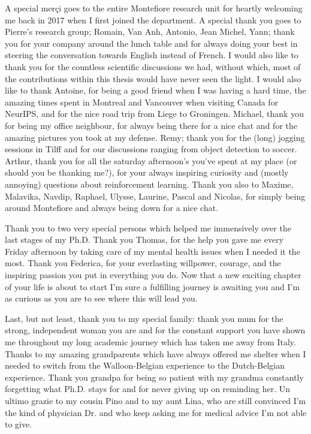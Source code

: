 A special merçi goes to the entire Montefiore research unit for heartly welcoming me back in 2017 when I first joined the department. A special thank you goes to Pierre's research group; Romain, Van Anh, Antonio, Jean Michel, Yann; thank you for your company around the lunch table and for always doing your best in steering the conversation towards English instead of French. I would also like to thank you for the countless scientific discussions we had, without which, most of the contributions within this thesis would have never seen the light. I would also like to thank Antoine, for being a good friend when I was having a hard time, the amazing times spent in Montreal and Vancouver when visiting Canada for NeurIPS, and for the nice road trip from Liege to Groningen. Michael, thank you for being my office neighbour, for always being there for a nice chat and for the amazing pictures you took at my defense. Remy; thank you for the (long) jogging sessions in Tilff and for our discussions ranging from object detection to soccer. Arthur, thank you for all the saturday afternoon's you've spent at my place (or should you be thanking me?), for your always inspiring curiosity and (mostly annoying) questions about reinforcement learning. Thank you also to Maxime, Malavika, Navdip, Raphael, Ulysse, Laurine, Pascal and Nicolas, for simply being around Montefiore and always being down for a nice chat.

Thank you to two very special persons which helped me immensively over the last stages of my Ph.D. Thank you Thomas, for the help you gave me every Friday afternoon by taking care of my mental health issues when I needed it the most. Thank you Federica, for your everlasting willpower, courage, and the inspiring passion you put in everything you do. Now that a new exciting chapter of your life is about to start I'm sure a fulfilling journey is awaiting you and I'm as curious as you are to see where this will lead you.

Last, but not least, thank you to my special family: thank you mum for the strong, independent woman you are and for the constant support you have shown me throughout my long academic journey which has taken me away from Italy. Thanks to my amazing grandparents which have always offered me shelter when I needed to switch from the Walloon-Belgian experience to the Dutch-Belgian experience. Thank you grandpa for being so patient with my grandma constantly forgetting what Ph.D. stays for and for never giving up on reminding her. Un ultimo grazie to my cousin Pino and to my aunt Lina, who are still convinced I'm the kind of physician Dr. and who keep asking me for medical advice I'm not able to give. 

 


\endgroup
